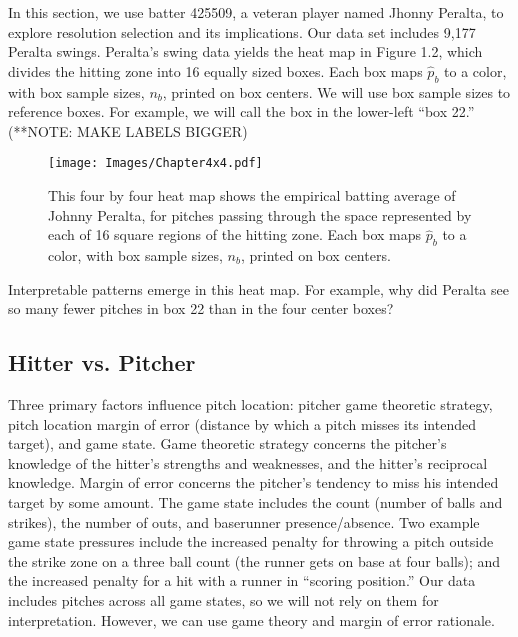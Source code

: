In this section, we use batter 425509, a veteran player named Jhonny Peralta, to explore resolution selection and its implications. Our data set includes 9,177 Peralta swings. Peralta's swing data yields the heat map in Figure 1.2, which divides the hitting zone into 16 equally sized boxes. Each box maps $\hat{p}_{b}$ to a color, with box sample sizes, $n_{b}$, printed on box centers. We will use box sample sizes to reference boxes. For example, we will call the box in the lower-left ``box 22.'' (**NOTE: MAKE LABELS BIGGER)
        \begin{figure}[H]
      	\centering
      	\texttt{[image: Images/Chapter4x4.pdf]} 
      	\caption{This four by four heat map shows the empirical batting average of Johnny Peralta, for pitches passing through the space represented by each of 16 square regions of the hitting zone. Each box maps $\hat{p}_{b}$ to a color, with box sample sizes, $n_{b}$, printed on box centers.}
      	\end{figure} 
Interpretable patterns emerge in this heat map. For example, why did Peralta see so many fewer pitches in box 22 than in the four center boxes? 

\subsection{Hitter vs. Pitcher} %

Three primary factors influence pitch location: pitcher game theoretic strategy, pitch location margin of error (distance by which a pitch misses its intended target), and game state. Game theoretic strategy concerns the pitcher's knowledge of the hitter's strengths and weaknesses, and the hitter's reciprocal knowledge. Margin of error concerns the pitcher's tendency to miss his intended target by some amount. The game state includes the count (number of balls and strikes), the number of outs, and baserunner presence/absence. Two example game state pressures include the increased penalty for throwing a pitch outside the strike zone on a three ball count (the runner gets on base at four balls); and the increased penalty for a hit with a runner in ``scoring position.'' Our data includes pitches across all game states, so we will not rely on them for interpretation. However, we can use game theory and margin of error rationale. 

